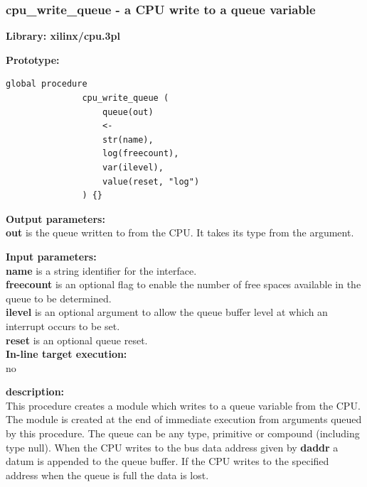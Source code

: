            



        \subsubsection{cpu\_write\_queue - a CPU write to a queue
                                            variable}\label{sec:lpcpuwrqueue}

            {\bf Library: xilinx/cpu.3pl}

            {\bf Prototype:} \\
            \vsp
            \begin{lstlisting}[gobble=12, language=threepl]
               global procedure
               cpu_write_queue (
                   queue(out)
                   <-
                   str(name),
                   log(freecount),
                   var(ilevel),
                   value(reset, "log")
               ) {}
            \end{lstlisting}

            {\bf Output parameters:} \\
            {\bf out} is the queue written to from the CPU. It takes its type
            from the argument.

            {\bf Input parameters:} \\            
            {\bf name} is a string identifier for the interface.\\
            {\bf freecount} is an optional flag to enable the number of free spaces
            available in the queue to be determined.\\
            {\bf ilevel} is an optional argument to allow the queue buffer level
            at which an interrupt occurs to be set.\\
            {\bf reset} is an optional queue reset.\\
        
            {\bf In-line target execution:} \\
            no

            {\bf description:} \\
            This procedure creates a module which writes to a queue variable from
            the CPU. The module is created at the end of immediate execution from
            arguments queued by this procedure. The queue can be any type, primitive
            or compound (including type null). When the CPU writes to the bus data
            address given by {\bf daddr} a datum is appended to the queue buffer. If
            the CPU writes to the specified address when the queue is full the data
            is lost.

